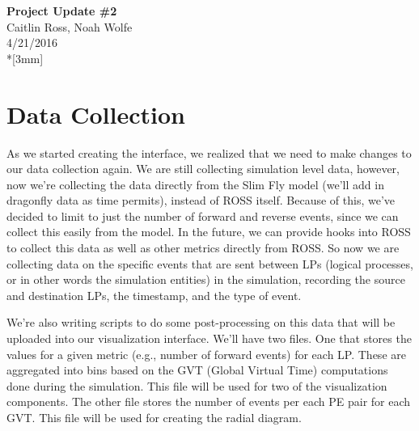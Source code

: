 \documentclass[12pt]{article}
\begin{document}
\thispagestyle{empty}
\begin{center}
{\Large\bf Project Update \#2}
\vspace{3mm}
\\Caitlin Ross, Noah Wolfe
\\4/21/2016
\\*[3mm]
\end{center}

\section{Data Collection}
As we started creating the interface, we realized that we need to make changes to our data collection again.  We are still collecting simulation level data, however, now we're collecting the data directly from the Slim Fly model (we'll add in dragonfly data as time permits), instead of ROSS itself.  Because of this, we've decided to limit to just the number of forward and reverse events, since we can collect this easily from the model.  In the future, we can provide hooks into ROSS to collect this data as well as other metrics directly from ROSS.  So now we are collecting data on the specific events that are sent between LPs (logical processes, or in other words the simulation entities) in the simulation, recording the source and destination LPs, the timestamp, and the type of event.  

We're also writing scripts to do some post-processing on this data that will be uploaded into our visualization interface.  We'll have two files.  One that stores the values for a given metric (e.g., number of forward events) for each LP.  These are aggregated into bins based on the GVT (Global Virtual Time) computations done during the simulation.  This file will be used for two of the visualization components. The other file stores the number of events per each PE pair for each GVT.  This file will be used for creating the radial diagram.  
\end{document}
